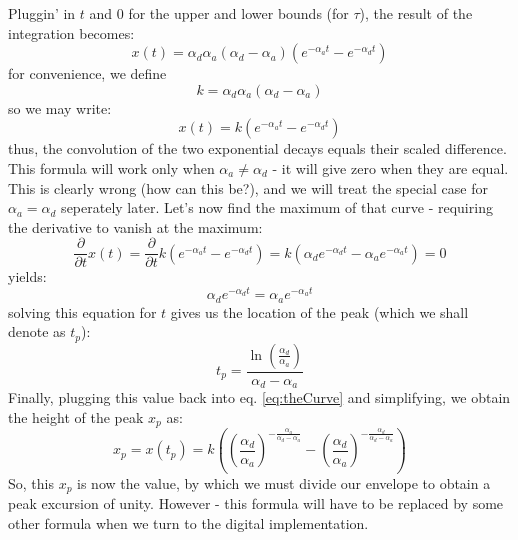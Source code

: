 Pluggin' in $t$ and $0$ for the upper and lower bounds (for $\tau$), the result of the integration becomes:
\begin{equation}
 x(t) = \alpha_d \alpha_a (\alpha_d-\alpha_a) (e^{-\alpha_a t} - e^{-\alpha_d t})
\end{equation}
for convenience, we define 
\begin{equation}
\label{eq:kDefinition}
\boxed
{
 k= \alpha_d \alpha_a (\alpha_d-\alpha_a)
}
\end{equation}
so we may write:
\begin{equation}
\label{eq:theCurve}
\boxed
{
 x(t) = k (e^{-\alpha_a t} - e^{-\alpha_d t})
}
\end{equation}
thus, the convolution of the two exponential decays equals their scaled difference. This formula will work only when $\alpha_a \neq \alpha_d$ - it will give zero when they are equal. This is clearly wrong (how can this be?), and we will treat the special case for $\alpha_a = \alpha_d$ seperately later. Let's now find the maximum of that curve - requiring the derivative to vanish at the maximum:
\begin{equation}
 \frac{\partial}{\partial t} x(t) 
 = \frac{\partial}{\partial t} k (e^{-\alpha_a t} - e^{-\alpha_d t})
 = k (\alpha_d e^{-\alpha_d t} - \alpha_a e^{-\alpha_a t}) = 0
\end{equation}
yields:
\begin{equation}
 \alpha_d e^{-\alpha_d t} = \alpha_a e^{-\alpha_a t}
\end{equation}
solving this equation for $t$ gives us the location of the peak (which we shall denote as $t_p$):
\begin{equation}
\label{eq:peakLocation}
\boxed
{
 t_p = \frac{\ln \left( \frac{\alpha_d}{\alpha_a} \right)}{\alpha_d-\alpha_a}  
}
\end{equation}
Finally, plugging this value back into eq. \ref{eq:theCurve} and simplifying, we obtain the height of the peak $x_p$ as:
\begin{equation}
\label{eq:peakHeightAnalog}
 x_p = x(t_p) = k \left(  \left(\frac{\alpha_d}{\alpha_a}\right)^{-\frac{\alpha_a}{\alpha_d-\alpha_a}} 
                         -\left(\frac{\alpha_d}{\alpha_a}\right)^{-\frac{\alpha_d}{\alpha_d-\alpha_a}} \right)
\end{equation}
So, this $x_p$ is now the value, by which we must divide our envelope to obtain a peak excursion of unity. However - this formula will have to be replaced by some other formula when we turn to the digital implementation.


